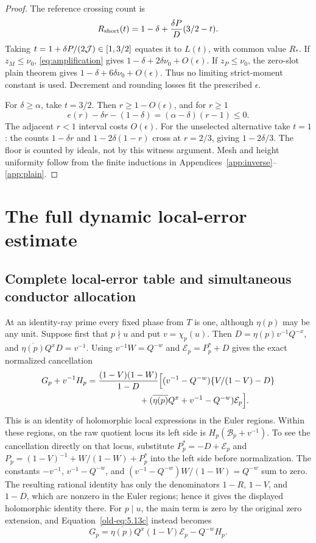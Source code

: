 \documentclass[12pt]{article}
\begin{document}
\begin{proof}
The reference crossing count is
\[
 R_{\rm short}(t)=1-\delta+\frac{\delta P}{D}(3/2-t).
\]
Taking \(t=1+\delta P/(2{\cal J})\in[1,3/2]\) equates it
to \(L(t)\), with common value \(R_*\).
If \(z_M\le\nu_0\), \eqref{eq:amplification} gives
\(1-\delta+2\delta\nu_0+O(\epsilon)\).
If \(z_P\le\nu_0\), the zero-slot plain theorem gives
\(1-\delta+6\delta\nu_0+O(\epsilon)\).
Thus no limiting strict-moment constant is used.
Decrement and rounding losses fit the prescribed \(\epsilon\).

For \(\delta\ge\alpha\), take \(t=3/2\).
Then \(r\ge1-O(\epsilon)\), and for \(r\ge1\)
\[
 e(r)-\delta r-(1-\delta)=(\alpha-\delta)(r-1)\le0.
\]
The adjacent \(r<1\) interval costs \(O(\epsilon)\).
For the unselected alternative take \(t=1\):
the counts \(1-\delta r\) and \(1-2\delta(1-r)\)
cross at \(r=2/3\), giving \(1-2\delta/3\).
The floor is counted by ideals, not by this witness argument.
Mesh and height uniformity follow from the finite inductions
in Appendices~\ref{app:inverse}--\ref{app:plain}.
\end{proof}
\section{The full dynamic local-error estimate}\label{sec:dynamic-errors}
\subsection{Complete local-error table and simultaneous conductor allocation}\label{own:local-errors}

At an identity-ray prime every fixed phase from $T$ is one, although
$\eta(p)$ may be any unit.  Suppose first that $p\nmid u$ and put
$v=\chi_p(u)$.  Then $D=\eta(p)v^{-1}Q^{-x}$, and
$\overline{\eta(p)}Q^xD=v^{-1}$.  Using
$v^{-1}W=Q^{-w}$ and $\mathcal E_p=P_p^*+D$ gives the exact
normalized cancellation
\begin{equation}\label{old-eq:5.13b}
\begin{split}
 G_p+v^{-1}H_p={}&
 \frac{(1-V)(1-W)}{1-D}
 \Bigl[(v^{-1}-Q^{-w})\{V/(1-V)-D\}\\
 &\hspace{17mm}+(\overline{\eta(p)}Q^x+v^{-1}-Q^{-w})
                    \mathcal E_p\Bigr].
\end{split}
\end{equation}
This is an identity of holomorphic local expressions in the Euler regions.
Within these regions, on the raw quotient locus its left side is
$H_p(\mathcal B_p+v^{-1})$.
To see the cancellation directly on that locus, substitute
$P_p^*=-D+\mathcal E_p$ and
$P_p=(1-V)^{-1}+W/(1-W)+P_p^*$ into the left side before
normalization.  The constants $-v^{-1}$, $v^{-1}-Q^{-w}$, and
$(v^{-1}-Q^{-w})W/(1-W)=Q^{-w}$ sum to zero.
The resulting rational identity has only the denominators $1-R$, $1-V$,
and $1-D$, which are nonzero in the Euler regions; hence it gives the
displayed holomorphic identity there.
For $p\mid u$, the main term is zero by the original zero extension,
and Equation~\eqref{old-eq:5.13c} instead becomes
\[
 G_p=
 \overline{\eta(p)}Q^x(1-V)\mathcal E_p-Q^{-w}H_p.
\]
\end{document}
